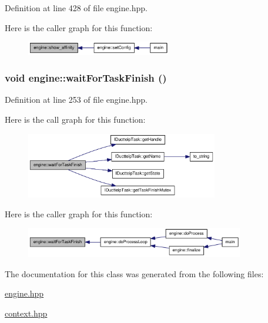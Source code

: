 Definition at line 428 of file engine.hpp.

Here is the caller graph for this function:\nopagebreak
\begin{figure}[H]
\begin{center}
\leavevmode
\includegraphics[width=179pt]{classengine_a2e4cd5ddf1d94f2e937d224c933608dd_icgraph}
\end{center}
\end{figure}
\hypertarget{classengine_a01a2f71979b984b73bd95cf00629a71a}{
\subsubsection[{waitForTaskFinish}]{\setlength{\rightskip}{0pt plus 5cm}void engine::waitForTaskFinish ()}}
\label{classengine_a01a2f71979b984b73bd95cf00629a71a}


Definition at line 253 of file engine.hpp.

Here is the call graph for this function:\nopagebreak
\begin{figure}[H]
\begin{center}
\leavevmode
\includegraphics[width=238pt]{classengine_a01a2f71979b984b73bd95cf00629a71a_cgraph}
\end{center}
\end{figure}


Here is the caller graph for this function:\nopagebreak
\begin{figure}[H]
\begin{center}
\leavevmode
\includegraphics[width=270pt]{classengine_a01a2f71979b984b73bd95cf00629a71a_icgraph}
\end{center}
\end{figure}


The documentation for this class was generated from the following files:\begin{DoxyCompactItemize}
\item 
\hyperlink{engine_8hpp}{engine.hpp}\item 
\hyperlink{context_8hpp}{context.hpp}\end{DoxyCompactItemize}
